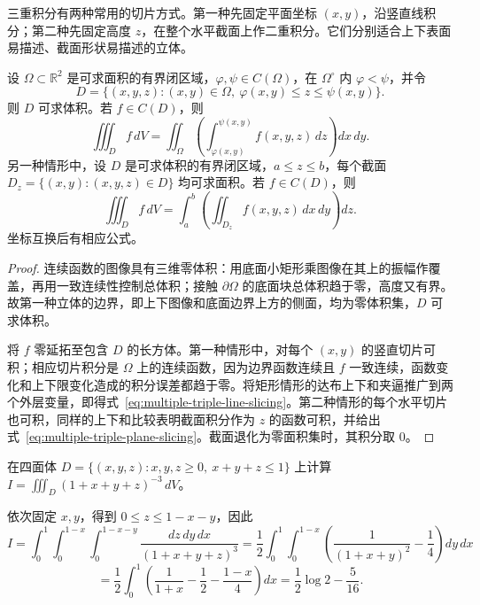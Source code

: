\documentclass[UTF8,12pt,a4paper,fontset=fandol]{ctexbook}
\begin{document}
三重积分有两种常用的切片方式。第一种先固定平面坐标 $(x,y)$，沿竖直线积分；第二种先固定高度 $z$，在整个水平截面上作二重积分。它们分别适合上下表面易描述、截面形状易描述的立体。

\begin{theorem}
\label{thm:multiple-triple-slicing}
设 $\Omega\subset\mathbb R^2$ 是可求面积的有界闭区域，$\varphi,\psi\in C(\Omega)$，在 $\Omega^\circ$ 内 $\varphi<\psi$，并令
\[
    D=\{(x,y,z):(x,y)\in\Omega,\ \varphi(x,y)\leq z\leq\psi(x,y)\}.
\]
则 $D$ 可求体积。若 $f\in C(D)$，则
\begin{equation}
    \iiint_Df\,dV
    =\iint_\Omega\left(\int_{\varphi(x,y)}^{\psi(x,y)}f(x,y,z)\,dz\right)dx\,dy.
    \label{eq:multiple-triple-line-slicing}
\end{equation}
另一种情形中，设 $D$ 是可求体积的有界闭区域，$a\leq z\leq b$，每个截面 $D_z=\{(x,y):(x,y,z)\in D\}$ 均可求面积。若 $f\in C(D)$，则
\begin{equation}
    \iiint_Df\,dV
    =\int_a^b\left(\iint_{D_z}f(x,y,z)\,dx\,dy\right)dz.
    \label{eq:multiple-triple-plane-slicing}
\end{equation}
坐标互换后有相应公式。
\end{theorem}
\begin{proof}
连续函数的图像具有三维零体积：用底面小矩形乘图像在其上的振幅作覆盖，再用一致连续性控制总体积；接触 $\partial\Omega$ 的底面块总体积趋于零，高度又有界。故第一种立体的边界，即上下图像和底面边界上方的侧面，均为零体积集，$D$ 可求体积。

将 $f$ 零延拓至包含 $D$ 的长方体。第一种情形中，对每个 $(x,y)$ 的竖直切片可积；相应切片积分是 $\Omega$ 上的连续函数，因为边界函数连续且 $f$ 一致连续，函数变化和上下限变化造成的积分误差都趋于零。将矩形情形的达布上下和夹逼推广到两个外层变量，即得式~\eqref{eq:multiple-triple-line-slicing}。第二种情形的每个水平切片也可积，同样的上下和比较表明截面积分作为 $z$ 的函数可积，并给出式~\eqref{eq:multiple-triple-plane-slicing}。截面退化为零面积集时，其积分取 $0$。
\end{proof}

\begin{example}
\label{ex:multiple-tetrahedron-integral}
在四面体 $D=\{(x,y,z):x,y,z\geq0,\ x+y+z\leq1\}$ 上计算 $\displaystyle I=\iiint_D(1+x+y+z)^{-3}\,dV$。
\end{example}
\begin{solve}
依次固定 $x,y$，得到 $0\leq z\leq1-x-y$，因此
\[
    I=\int_0^1\int_0^{1-x}\int_0^{1-x-y}
    \frac{dz\,dy\,dx}{(1+x+y+z)^3}
    =\frac12\int_0^1\int_0^{1-x}
    \left(\frac1{(1+x+y)^2}-\frac14\right)dy\,dx
\]
\[
    =\frac12\int_0^1\left(\frac1{1+x}-\frac12-\frac{1-x}{4}\right)dx
    =\frac12\log2-\frac5{16}.
\]
\end{solve}
\end{document}
